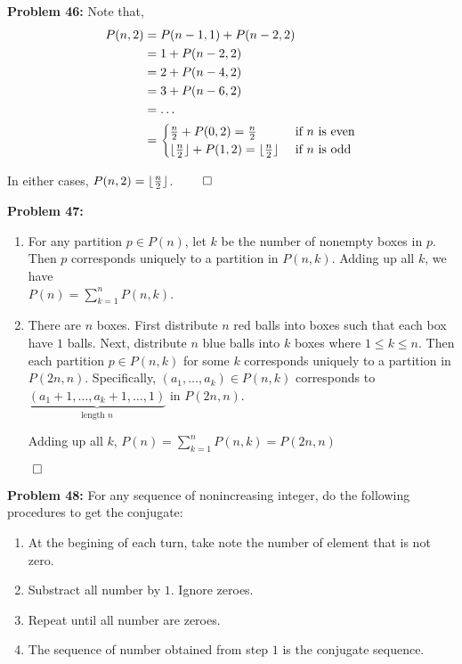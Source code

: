 \documentclass[12pt]{article}
\DeclarePairedDelimiter{\floor}{\lfloor}{\rfloor}
\newcommand{\prob}[1]{\textbf{Problem #1:}}
\begin{document}
\prob{46} Note that,
\begin{align*}
    P(n,2) &= P(n-1, 1) + P(n-2, 2) \\
    &= 1 + P(n-2, 2) \\
    &= 2 + P(n-4, 2) \\ 
    &= 3 + P(n-6, 2) \\ 
    &= \dots \\
    &= \begin{cases}
            \frac{n}{2} + P(0,2) = \frac{n}{2} & \text{ if $n$ is even} \\
            \floor{\frac{n}{2}} + P(1,2) = \floor{\frac{n}{2}} & \text { if $n$ is odd}
        \end{cases}
\end{align*}

In either cases, $P(n,2) = \floor{\frac{n}{2}}$. $\qed$

\prob{47}
\begin{enumerate}[label=(\alph*)]
    \item For any partition $p \in P(n)$, let $k$ be the number of nonempty boxes in $p$. Then $p$ corresponds uniquely to a partition in $P(n, k)$. Adding up all $k$, we have \\$P(n) = \sum\limits^n_{k=1}P(n,k)$. 
    \item There are $n$ boxes. First distribute $n$ red balls into boxes such that each box have $1$ balls. Next, distribute $n$ blue balls into $k$ boxes where $1 \le k \le n$. Then each partition $p \in P(n, k)$ for some $k$ corresponds uniquely to a partition in $P(2n, n)$. Specifically, $(a_1, \dots, a_k) \in P(n,k)$ corresponds to $\underbrace{(a_1 + 1, \dots, a_k + 1, \dots, 1)}_{\text{length $n$}}$ in $P(2n,n)$.
    
    Adding up all $k$, $P(n) = \sum\limits^n_{k=1}P(n,k) = P(2n,n)$
\end{enumerate} $\qed$

\prob{48} For any sequence of nonincreasing integer, do the following procedures to get the conjugate: 
    \indent\begin{enumerate}
        \item At the begining of each turn, take note the number of element that is not zero. 
        \item Substract all number by $1$. Ignore zeroes.
        \item Repeat until all number are zeroes.
        \item The sequence of number obtained from step $1$ is the conjugate sequence.
    \end{enumerate}
\end{document}
